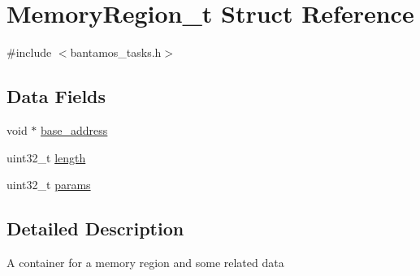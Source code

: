 \hypertarget{struct_memory_region__t}{\section{Memory\-Region\-\_\-t Struct Reference}
\label{struct_memory_region__t}
}


{\ttfamily \#include $<$bantamos\-\_\-tasks.\-h$>$}

\subsection*{Data Fields}
\begin{DoxyCompactItemize}
\item 
void $\ast$ \hyperlink{struct_memory_region__t_ae4433d6e012d62e85ea5c37879c6bc91}{base\-\_\-address}
\item 
uint32\-\_\-t \hyperlink{struct_memory_region__t_aebb70c2aab3407a9f05334c47131a43b}{length}
\item 
uint32\-\_\-t \hyperlink{struct_memory_region__t_aacc4ff38dddfc92c7929e3fc9ead2f7e}{params}
\end{DoxyCompactItemize}


\subsection{Detailed Description}
A container for a memory region and some related data 

